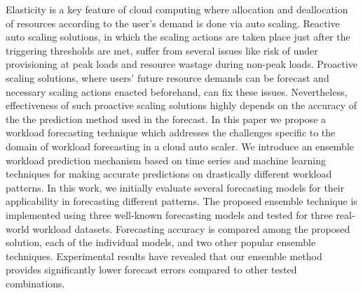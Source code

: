 Elasticity is a key feature of cloud computing where allocation and deallocation of resources according to the user’s demand is done via auto scaling. Reactive auto scaling solutions, in which the scaling actions are taken place just after the triggering thresholds are met, suffer from several issues like risk of under provisioning at peak loads and resource wastage during non-peak loads. Proactive scaling solutions, where users’ future resource demands can be forecast and necessary scaling actions enacted beforehand, can fix these issues. Nevertheless, effectiveness of such proactive scaling solutions highly depends on the accuracy of the the prediction method used in the forecast.
In this paper we propose a workload forecasting technique which addresses the challenges specific to the domain of workload forecasting in a cloud auto scaler. We introduce an ensemble workload prediction mechanism based on time series and machine learning techniques for making accurate predictions on drastically different workload patterns. In this work, we initially evaluate several forecasting models for their applicability in forecasting different patterns. The proposed ensemble technique is implemented using three well-known forecasting models and tested for three real-world workload datasets. Forecasting accuracy is compared among the proposed solution, each of the individual models, and two other popular ensemble techniques. Experimental results have revealed that our ensemble method provides significantly lower forecast errors compared to other tested combinations.
